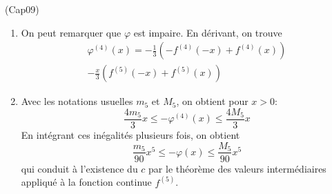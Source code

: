 \begin{tiny}(Cap09)\end{tiny} 
\begin{enumerate}
 \item On peut remarquer que $\varphi$ est impaire. En dérivant, on trouve
\begin{multline*}
 \varphi^{(4)}(x)
= -\frac{1}{3}\left(-f^{(4)}(-x)+f^{(4)}(x) \right) \\
-\frac{x}{3} \left( f^{(5)}(-x)+f^{(5)}(x) \right)
\end{multline*}

\item Avec les notations usuelles $m_5$ et $M_5$, on obtient pour $x>0$:
\begin{displaymath}
 \frac{4m_5}{3}x\leq -\varphi^{(4)}(x) \leq \frac{4M_5}{3}x
\end{displaymath}
En intégrant ces inégalités plusieurs fois, on obtient
\begin{displaymath}
 \frac{m_5}{90}x^5\leq -\varphi(x) \leq \frac{M_5}{90}x^5
\end{displaymath}
qui conduit à l'existence du $c$ par le théorème des valeurs intermédiaires appliqué à la fonction continue $f^{(5)}$.
\end{enumerate}
